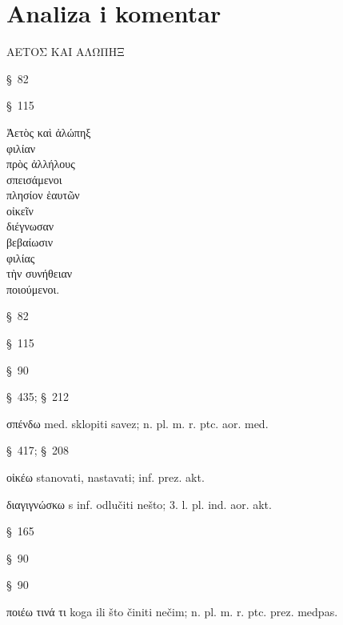 \section*{Analiza i komentar}


{\large
\begin{greek}
\noindent ΑΕΤΟΣ ΚΑΙ ΑΛΩΠΗΞ

\end{greek}
}

\begin{description}[noitemsep]
\item[ΑΕΤΟΣ] §~82
\item[ΑΛΩΠΗΞ] §~115

\end{description}

{\large
\begin{greek}
\noindent Ἀετὸς καὶ ἀλώπηξ \\
\tabto{2em} φιλίαν \\
\tabto{3em} πρὸς ἀλλήλους \\
\tabto{2em} σπεισάμενοι \\
πλησίον ἑαυτῶν \\
\tabto{2em} οἰκεῖν \\
διέγνωσαν \\
\tabto{2em} βεβαίωσιν \\
\tabto{4em} φιλίας \\
\tabto{2em} τὴν συνήθειαν \\
\tabto{3em} ποιούμενοι.\\

\end{greek}
}

\begin{description}[noitemsep]
\item[Ἀετὸς] §~82
\item[ἀλώπηξ ] §~115
\item[φιλίαν ] §~90
\item[πρὸς ἀλλήλους ] §~435; §~212
\item[σπεισάμενοι ] σπένδω med. sklopiti savez; n. pl. m. r. ptc. aor. med.
\item[πλησίον ἑαυτῶν ] §~417; §~208
\item[οἰκεῖν ] οἰκέω stanovati, nastavati; inf. prez. akt.
\item[διέγνωσαν ] διαγιγνώσκω s inf. odlučiti nešto; 3. l. pl. ind. aor. akt.
\item[βεβαίωσιν ] §~165
\item[φιλίας ] §~90
\item[τὴν συνήθειαν ] §~90
\item[ποιούμενοι] ποιέω τινά τι koga ili što činiti nečim; n. pl. m. r. ptc. prez. medpas.

\end{description}


